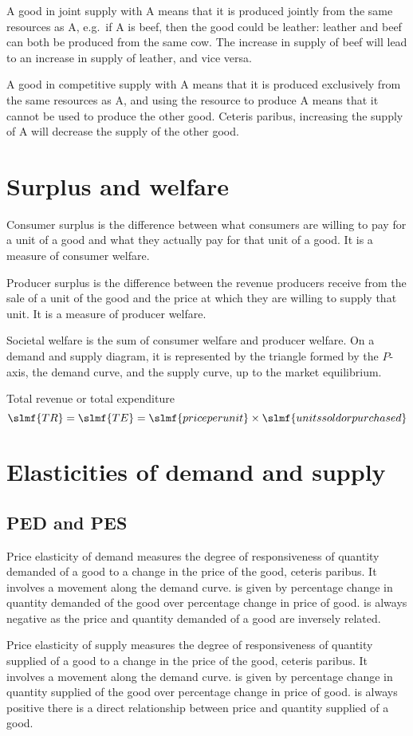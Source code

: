 \documentclass[Economics.tex]{subfiles}
\begin{document}
A good in joint supply with A means that it is produced jointly from the same resources as A, e.g.\ if A is beef, then the good could be leather: leather and beef can both be produced from the same cow. The increase in supply of beef will lead to an increase in supply of leather, and vice versa.

A good in competitive supply with A means that it is produced exclusively from the same resources as A, and using the resource to produce A means that it cannot be used to produce the other good. Ceteris paribus, increasing the supply of A will decrease the supply of the other good.
\section{Surplus and welfare}
Consumer surplus is the difference between what consumers are willing to pay for a unit of a good and what they actually pay for that unit of a good. It is a measure of consumer welfare.

Producer surplus is the difference between the revenue producers receive from the sale of a unit of the good and the price at which they are willing to supply that unit. It is a measure of producer welfare.

Societal welfare is the sum of consumer welfare and producer welfare. On a demand and supply diagram, it is represented by the triangle formed by the \(P\)-axis, the demand curve, and the supply curve, up to the market equilibrium.

Total revenue or total expenditure \[\slmf{TR} = \slmf{TE} = \slmf{price per unit} \times \slmf{units sold or purchased}\]
\section{Elasticities of demand and supply}
\subsection{PED and PES}
Price elasticity of demand measures the degree of responsiveness of quantity demanded of a good to a change in the price of the good, ceteris paribus. It involves a movement along the demand curve. \PE[D] is given by percentage change in quantity demanded of the good over percentage change in price of good. \PE[D] is always negative as the price and quantity demanded of a good are inversely related.

Price elasticity of supply measures the degree of responsiveness of quantity supplied of a good to a change in the price of the good, ceteris paribus. It involves a movement along the demand curve. \PE[S] is given by percentage change in quantity supplied of the good over percentage change in price of good. \PE[S] is always positive there is a direct relationship between price and quantity supplied of a good.
\end{document}
